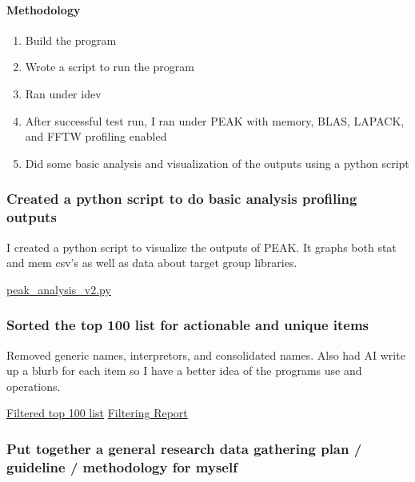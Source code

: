 \documentclass[
]{article}
\providecommand{\tightlist}{%
  \setlength{\itemsep}{0pt}\setlength{\parskip}{0pt}}
\begin{document}
\paragraph{Methodology}\label{methodology}

\begin{enumerate}
\def\labelenumi{\arabic{enumi}.}
\tightlist
\item
  Build the program
\item
  Wrote a script to run the program
\item
  Ran under idev
\item
  After successful test run, I ran under PEAK with memory, BLAS, LAPACK,
  and FFTW profiling enabled
\item
  Did some basic analysis and visualization of the outputs using a
  python script
\end{enumerate}

\subsubsection{Created a python script to do basic analysis profiling
outputs}\label{created-a-python-script-to-do-basic-analysis-profiling-outputs}

I created a python script to visualize the outputs of PEAK. It graphs
both stat and mem csv's as well as data about target group libraries.

\href{./peak_analysis_v2.py}{peak\_analysis\_v2.py}

\subsubsection{Sorted the top 100 list for actionable and unique
items}\label{sorted-the-top-100-list-for-actionable-and-unique-items}

Removed generic names, interpretors, and consolidated names. Also had AI
write up a blurb for each item so I have a better idea of the programs
use and operations.

\href{./filtered_list.txt}{Filtered top 100 list}
\href{./tacc_hpc_top100_complete_guide.md}{Filtering Report}

\subsubsection{Put together a general research data gathering plan /
guideline / methodology for
myself}\label{put-together-a-general-research-data-gathering-plan-guideline-methodology-for-myself}
\end{document}
